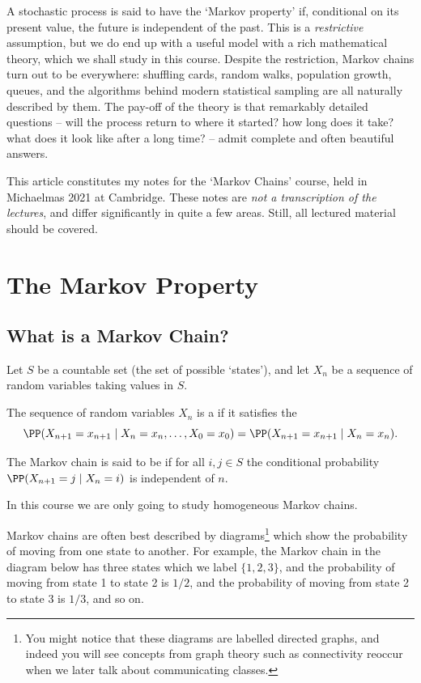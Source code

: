 



A stochastic process is said to have the `Markov property' if, conditional on its present value, the future is independent of the past.
This is a \emph{restrictive} assumption, but we do end up with a useful model with a rich mathematical theory, which we shall study in this course.
Despite the restriction, Markov chains turn out to be everywhere: shuffling cards, random walks, population growth, queues, and the algorithms behind modern statistical sampling are all naturally described by them. The pay-off of the theory is that remarkably detailed questions -- will the process return to where it started? how long does it take? what does it look like after a long time? -- admit complete and often beautiful answers.

This article constitutes my notes for the `Markov Chains' course, held in Michaelmas 2021 at Cambridge. These notes are \emph{not a transcription of the lectures}, and differ significantly in quite a few areas. Still, all lectured material should be covered.





\section{The Markov Property}

\subsection{What is a Markov Chain?}

Let $S$ be a countable set (the set of possible `states'), and let $X_n$ be a sequence of random variables taking values in $S$.

\begin{definition}
	The sequence of random variables $X_n$ is a  if it satisfies the 
	$$
	\PP(X_{n + 1} = x_{n + 1} \mid X_n = x_n, \dots, X_0 = x_0) = \PP(X_{n + 1} = x_{n + 1} \mid X_n = x_n).
	$$

	The Markov chain is said to be  if for all $i, j \in S$ the conditional probability $\PP(X_{n + 1} = j \mid X_n = i)$ is independent of $n$.
\end{definition}

In this course we are only going to study homogeneous Markov chains.

Markov chains are often best described by diagrams\footnote{You might notice that these diagrams are labelled directed graphs, and indeed you will see concepts from graph theory such as connectivity reoccur when we later talk about communicating classes.} which show the probability of moving from one state to another.
For example, the Markov chain in the diagram below has three states which we label $\{1, 2, 3\}$, and the probability of moving from state 1 to state 2 is $1/2$, and the probability of moving from state 2 to state 3 is $1/3$, and so on.

